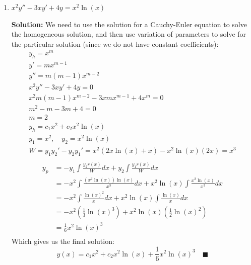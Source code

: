 \documentclass[letterpaper, fontsize=11pt]{scrartcl} %
\numberwithin{equation}{section} %
\numberwithin{figure}{section} %
\numberwithin{table}{section} %
\begin{document}
\begin{enumerate}
\begin{enumerate}
\item $x^2y'' -3xy' +4y=x^2 \ln(x)$
\par \textbf{Solution:} We need to use the solution for a Cauchy-Euler equation to solve the homogeneous solution, and then use variation of parameters to solve for the particular solution (since we do not have constant coefficients):
\begin{gather*}
y_h = x^m\\
y' = mx^{m-1}\\
y'' = m(m-1)x^{m-2}\\
x^2y'' -3xy' +4y=0\\
x^2m(m-1)x^{m-2} -3xmx^{m-1} +4x^m=0\\
m^2 - m - 3m + 4=0\\
m = 2 \\
y_h = c_1x^2 + c_2 x^2\ln(x) \\
y_1 = x^2,\quad y_2 = x^2\ln(x) \\
W = y_1y_2' - y_2 y_1' = x^2(2x\ln(x) + x)- x^2\ln(x)(2x) = x^3\\
\end{gather*}
\begin{align*}
y_p &= -y_1\int\frac{y_2r(x)}{W}dx  + y_2 \int\frac{y_1r(x)}{W}dx\\
 &= -x^2\int\frac{\left(x^2\ln(x)\right)\ln(x)}{x^3}dx  + x^2\ln(x) \int\frac{x^2\ln(x)}{x^3}dx\\
 &= -x^2\int\frac{\ln(x)^2}{x}dx  + x^2\ln(x) \int\frac{\ln(x)}{x}dx\\
 &= -x^2\left(\frac{1}{3}\ln(x)^3\right)  + x^2\ln(x) \left(\frac{1}{2}\ln(x)^2\right)\\
 &= \frac{1}{6}x^2\ln(x)^3\\
\end{align*}
Which gives us the final solution:
\[ y(x) = c_1x^2 + c_2 x^2\ln(x) + \frac{1}{6}x^2\ln(x)^3\quad\blacksquare\]


\end{enumerate}
\end{enumerate}
\end{document}
